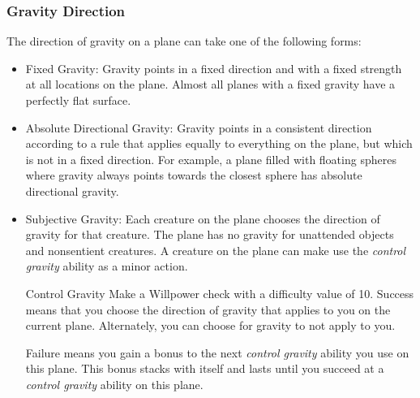         \subsubsection{Gravity Direction}
            The direction of gravity on a plane can take one of the following forms:
            \begin{itemize}
                \item Fixed Gravity: Gravity points in a fixed direction and with a fixed strength at all locations on the plane.
                    Almost all planes with a fixed gravity have a perfectly flat surface.
                \item Absolute Directional Gravity: Gravity points in a consistent direction according to a rule that applies equally to everything on the plane, but which is not in a fixed direction.
                    For example, a plane filled with floating spheres where gravity always points towards the closest sphere has absolute directional gravity.
                \item Subjective Gravity: Each creature on the plane chooses the direction of gravity for that creature.
                    The plane has no gravity for unattended objects and nonsentient creatures.
                    A creature on the plane can make use the \textit{control gravity} ability as a minor action.
                    \begin{freeability}{Control Gravity}
                        Make a Willpower check with a difficulty value of 10.
                        Success means that you choose the direction of gravity that applies to you on the current plane.
                        Alternately, you can choose for gravity to not apply to you.

                        Failure means you gain a  bonus to the next \textit{control gravity} ability you use on this plane.
                        This bonus stacks with itself and lasts until you succeed at a \textit{control gravity} ability on this plane.
                    \end{freeability}
            \end{itemize}

